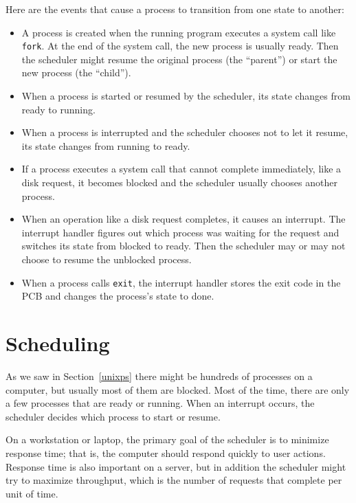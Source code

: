\documentclass[12pt]{book}
\begin{document}
Here are the events that cause a process to transition from one state to another:

\begin{itemize}

\item A process is created when the running program executes a system
  call like {\tt fork}.  At the end of the system call, the new
  process is usually ready.  Then the scheduler might resume the
  original process (the ``parent'') or start the new process (the
  ``child'').

\item When a process is started or resumed by the scheduler, its state
  changes from ready to running.

\item When a process is interrupted and the scheduler chooses not
  to let it resume, its state changes from running to ready.

\item If a process executes a system call that cannot complete
  immediately, like a disk request, it becomes blocked
  and the scheduler usually chooses another process.

\item When an operation like a disk request completes, it causes an
  interrupt.  The interrupt handler figures out which process was
  waiting for the request and switches its state from
  blocked to ready.  Then the scheduler may or may not choose to
  resume the unblocked process.

\item When a process calls {\tt exit}, the interrupt handler stores
  the exit code in the PCB and changes the process's state to done.

\end{itemize}


\section{Scheduling}

As we saw in Section~\ref{unixps} there might be hundreds of
processes on a computer, but usually most of them are blocked.  Most
of the time, there are only a few processes that are ready or running.
When an interrupt occurs, the scheduler decides which process to start
or resume.

On a workstation or laptop, the primary goal of the scheduler is to
minimize response time; that is, the computer should respond quickly
to user actions.  Response time is also important on a server, but in
addition the scheduler might try to maximize throughput, which is the
number of requests that complete per unit of time.
\end{document}
